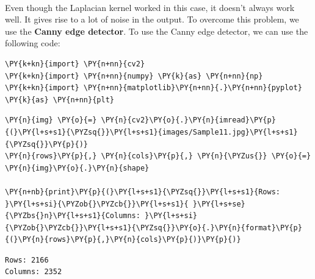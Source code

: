 \begin{center}
\end{center}
{ \hspace*{\fill} \\}

Even though the Laplacian kernel worked in this case, it doesn't always work well. It gives rise to a lot of noise in the output. To overcome this problem, we use the \textbf{Canny edge detector}. To use the Canny edge detector, we can use the following code:

\vspace{0.5cm}

\begin{tcolorbox}[breakable, size=fbox, boxrule=1pt, pad at break*=1mm,colback=cellbackground, colframe=cellborder]
	\begin{Verbatim}[commandchars=\\\{\}]
\PY{k+kn}{import} \PY{n+nn}{cv2}
\PY{k+kn}{import} \PY{n+nn}{numpy} \PY{k}{as} \PY{n+nn}{np}
\PY{k+kn}{import} \PY{n+nn}{matplotlib}\PY{n+nn}{.}\PY{n+nn}{pyplot} \PY{k}{as} \PY{n+nn}{plt}
	\end{Verbatim}
\end{tcolorbox}

\begin{tcolorbox}[breakable, size=fbox, boxrule=1pt, pad at break*=1mm,colback=cellbackground, colframe=cellborder]
	\begin{Verbatim}[commandchars=\\\{\}]
\PY{n}{img} \PY{o}{=} \PY{n}{cv2}\PY{o}{.}\PY{n}{imread}\PY{p}{(}\PY{l+s+s1}{\PYZsq{}}\PY{l+s+s1}{images/Sample11.jpg}\PY{l+s+s1}{\PYZsq{}}\PY{p}{)}
\PY{n}{rows}\PY{p}{,} \PY{n}{cols}\PY{p}{,} \PY{n}{\PYZus{}} \PY{o}{=} \PY{n}{img}\PY{o}{.}\PY{n}{shape}

\PY{n+nb}{print}\PY{p}{(}\PY{l+s+s1}{\PYZsq{}}\PY{l+s+s1}{Rows: }\PY{l+s+si}{\PYZob{}\PYZcb{}}\PY{l+s+s1}{ }\PY{l+s+se}{\PYZbs{}n}\PY{l+s+s1}{Columns: }\PY{l+s+si}{\PYZob{}\PYZcb{}}\PY{l+s+s1}{\PYZsq{}}\PY{o}{.}\PY{n}{format}\PY{p}{(}\PY{n}{rows}\PY{p}{,}\PY{n}{cols}\PY{p}{)}\PY{p}{)}
	\end{Verbatim}
\end{tcolorbox}

\begin{Verbatim}[commandchars=\\\{\}]
Rows: 2166
Columns: 2352
\end{Verbatim}

